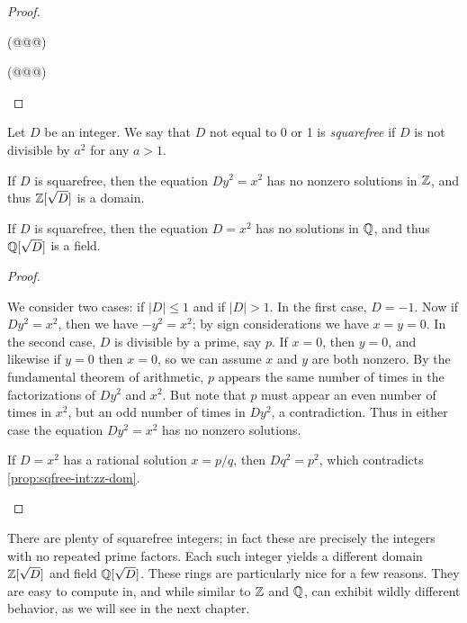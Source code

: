 \begin{proof}
\begin{inlineproplist}
\item (@@@)
\item (@@@)
\end{inlineproplist}
\end{proof}

\begin{prop} \label{prop:sqfree-int}
Let \(D\) be an integer.
We say that \(D\) not equal to 0 or 1 is \emph{squarefree} if \(D\) is not divisible by \(a^2\) for any \(a > 1\).
\begin{proplist}
\item \label{prop:sqfree-int:zz-dom} If \(D\) is squarefree, then the equation \(Dy^2 = x^2\) has no nonzero solutions in \(\mathbb{Z}\), and thus \(\mathbb{Z}[\sqrt{D}]\) is a domain.
\item \label{prop:sqfree-int:qq-field} If \(D\) is squarefree, then the equation \(D = x^2\) has no solutions in \(\mathbb{Q}\), and thus \(\mathbb{Q}[\sqrt{D}]\) is a field.
\end{proplist}
\end{prop}

\begin{proof}
\begin{inlineproplist}
\item We consider two cases: if \(|D| \leq 1\) and if \(|D| > 1\).
In the first case, \(D = -1\).
Now if \(Dy^2 = x^2\), then we have \(-y^2 = x^2\); by sign considerations we have \(x = y = 0\).
In the second case, \(D\) is divisible by a prime, say \(p\).
If \(x = 0\), then \(y = 0\), and likewise if \(y = 0\) then \(x = 0\), so we can assume \(x\) and \(y\) are both nonzero.
By the fundamental theorem of arithmetic, \(p\) appears the same number of times in the factorizations of \(Dy^2\) and \(x^2\).
But note that \(p\) must appear an even number of times in \(x^2\), but an odd number of times in \(Dy^2\), a contradiction.
Thus in either case the equation \(Dy^2 = x^2\) has no nonzero solutions.
\item If \(D = x^2\) has a rational solution \(x = p/q\), then \(Dq^2 = p^2\), which contradicts \ref{prop:sqfree-int:zz-dom}.
\end{inlineproplist}
\end{proof}

There are plenty of squarefree integers; in fact these are precisely the integers with no repeated prime factors.
Each such integer yields a different domain \(\mathbb{Z}[\sqrt{D}]\) and field \(\mathbb{Q}[\sqrt{D}]\).
These rings are particularly nice for a few reasons.
They are easy to compute in, and while similar to \(\mathbb{Z}\) and \(\mathbb{Q}\), can exhibit wildly different behavior, as we will see in the next chapter.




